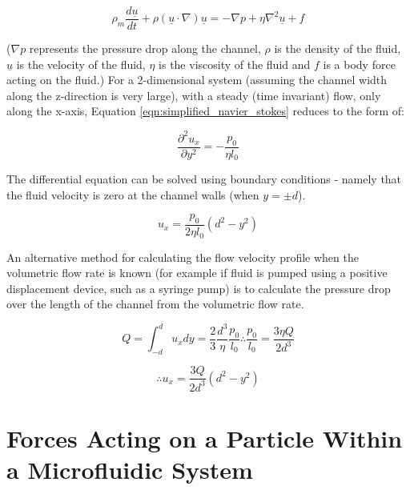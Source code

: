 \begin{equation}
 \rho_{m} \frac {d\underline{u}}{dt} + \rho (\underline{u} \cdot \nabla)\underline{u} = -\nabla p + \eta \nabla^{2} \underline{u} + f
\label{eqn:simplified_navier_stokes}
\end{equation}


($\nabla p$ represents the pressure drop along the channel, $\rho$ is the density of the fluid, $\underline{u}$ is the velocity of the fluid, $\eta$ is the viscosity of the fluid and $f$ is a body force acting on the fluid.) For a 2-dimensional system (assuming the channel width along the z-direction is very large), with a steady (time invariant) flow, only along the x-axis, Equation \ref{eqn:simplified_navier_stokes} reduces to the form of:

\begin{equation}
 \frac{\partial^{2}u_{x}}{\partial y^{2}} = - \frac {p_{0}} {\eta l_{0}}
\label{eqn:2d_steady_state_navier_stokes}
\end{equation}

The differential equation can be solved using boundary conditions - namely that the
fluid velocity is zero at the channel walls (when $y=\pm d$).

\begin{equation}
 u_{x} = \frac {p_{0}} {2\eta l_{0}} (d^{2} - y^{2})
\label{2d_steady_state_solution_navier_stokes}
\end{equation}


An alternative method for calculating the flow velocity profile when the volumetric flow rate is known (for example if fluid is pumped using a positive displacement device, such as a syringe pump) is to calculate the pressure drop over the length of the channel from the volumetric flow rate.

\begin{equation}
 Q =  \int_{-d}^{d} u_{x} dy
= \frac{2}{3}\frac{d^{3}}{\eta} \frac{p_{0}}{l_{0}} 
\therefore \frac{p_{0}}{l_{0}} = \frac{3 \eta Q}{2 d^{3}}
\label{derivation_vfp_from_vfr}
\end{equation}

\begin{equation}
 \therefore u_{x} = \frac{3 Q}{2 d^{3}}(d^{2}-y^{2})
\label{2d_solution_from_Q_navier_stokes}
\end{equation}

\section{Forces Acting on a Particle Within a Microfluidic System}
\label{sec:Forces_Particle_Microfluidic_System}

